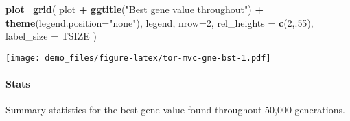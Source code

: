 \documentclass[]{book}
\newenvironment{Shaded}{\begin{snugshade}}{\end{snugshade}}
\newcommand{\DataTypeTok}[1]{\textcolor[rgb]{0.13,0.29,0.53}{#1}}
\newcommand{\DecValTok}[1]{\textcolor[rgb]{0.00,0.00,0.81}{#1}}
\newcommand{\KeywordTok}[1]{\textcolor[rgb]{0.13,0.29,0.53}{\textbf{#1}}}
\newcommand{\NormalTok}[1]{#1}
\newcommand{\OperatorTok}[1]{\textcolor[rgb]{0.81,0.36,0.00}{\textbf{#1}}}
\newcommand{\OtherTok}[1]{\textcolor[rgb]{0.56,0.35,0.01}{#1}}
\newcommand{\StringTok}[1]{\textcolor[rgb]{0.31,0.60,0.02}{#1}}
\let\oldparagraph\paragraph
\renewcommand{\paragraph}[1]{\oldparagraph{#1}\mbox{}}
\begin{document}
\begin{Shaded}
\begin{Highlighting}[]
\KeywordTok{plot_grid}\NormalTok{(}
\NormalTok{  plot }\OperatorTok{+}
\StringTok{    }\KeywordTok{ggtitle}\NormalTok{(}\StringTok{"Best gene value throughout"}\NormalTok{) }\OperatorTok{+}
\StringTok{    }\KeywordTok{theme}\NormalTok{(}\DataTypeTok{legend.position=}\StringTok{"none"}\NormalTok{),}
\NormalTok{  legend,}
  \DataTypeTok{nrow=}\DecValTok{2}\NormalTok{,}
  \DataTypeTok{rel_heights =} \KeywordTok{c}\NormalTok{(}\DecValTok{2}\NormalTok{,.}\DecValTok{55}\NormalTok{),}
  \DataTypeTok{label_size =}\NormalTok{ TSIZE}
\NormalTok{)}
\end{Highlighting}
\end{Shaded}

\texttt{[image: demo\_files/figure-latex/tor-mvc-gne-bst-1.pdf]}

\hypertarget{stats-39}{%
\paragraph{Stats}\label{stats-39}}

Summary statistics for the best gene value found throughout 50,000 generations.

\begin{Shaded}
\end{Shaded}
\end{document}
